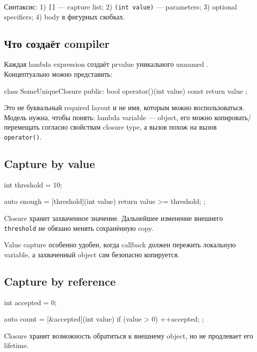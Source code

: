 Синтаксис:
1) \texttt{[]} --- capture list; 2) \texttt{(int value)} --- parameters; 3) optional specifiers; 4) body в фигурных скобках.

\subsection{Что создаёт compiler}

Каждая lambda expression создаёт prvalue уникального unnamed
. Концептуально можно представить:

\begin{cppcode}
class SomeUniqueClosure {
public:
    bool operator()(int value) const {
        return value %
    }
};
\end{cppcode}

Это не буквальный required layout и не имя, которым можно воспользоваться.
Модель нужна, чтобы понять:
lambda variable --- object, его можно копировать/перемещать согласно свойствам
closure type, а вызов похож на вызов \texttt{operator()}.

\subsection{Capture by value}

\begin{cppcode}
int threshold = 10;

auto enough = [threshold](int value) {
    return value >= threshold;
};
\end{cppcode}

Closure хранит захваченное значение. Дальнейшее изменение внешнего
\texttt{threshold} не обязано менять сохранённую copy.

Value capture особенно удобен, когда callback должен пережить локальную
variable, а захваченный object сам безопасно копируется.

\subsection{Capture by reference}

\begin{cppcode}
int accepted = 0;

auto count = [&accepted](int value) {
    if (value > 0) {
        ++accepted;
    }
};
\end{cppcode}

Closure хранит возможность обратиться к внешнему object, но не продлевает его
lifetime.

